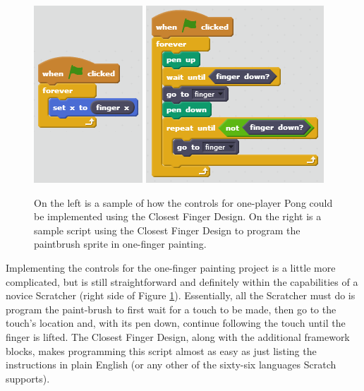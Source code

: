 \begin{figure}
\centering
\includegraphics{images/OnePlayerPongCFD.PNG}
\includegraphics{images/OneFingerPaintingCFD.PNG}
\caption[Sample Closest Finger Design Scripts For Low Floor Case Projects]{On the left is a sample of how the controls for one-player Pong could be implemented using the Closest Finger Design. On the right is a sample script using the Closest Finger Design to program the paintbrush sprite in one-finger painting.}
\label{OnePlayerPongCFDOneFingerPaintingCFD}
\end{figure}

Implementing the controls for the one-finger painting project is a little more complicated, but is still straightforward and definitely within the capabilities of a novice Scratcher (right side of Figure \ref{OnePlayerPongCFDOneFingerPaintingCFD}). Essentially, all the Scratcher must do is program the paint-brush to first wait for a touch to be made, then go to the touch's location and, with its pen down, continue following the touch until the finger is lifted. The Closest Finger Design, along with the additional framework blocks, makes programming this script almost as easy as just listing the instructions in plain English (or any other of the sixty-six languages Scratch supports).

